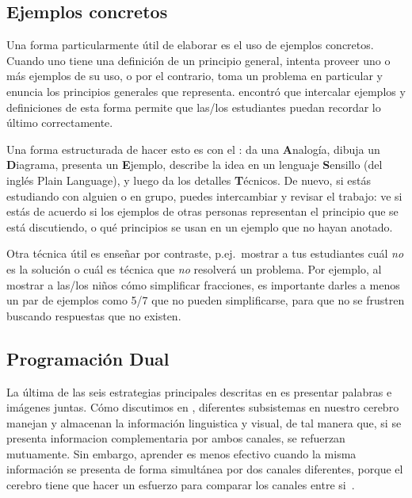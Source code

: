 \subsection*{Ejemplos concretos}

Una forma particularmente útil de elaborar es el uso de ejemplos concretos.
Cuando uno tiene una definición de un principio general,
intenta proveer uno o más ejemplos de su uso,
o por el contrario, toma un problema en particular y enuncia los principios generales que representa.
\cite{Raws2014} encontró que intercalar ejemplos y definiciones de esta forma
permite que las/los estudiantes puedan recordar lo último correctamente.

Una forma estructurada de hacer esto es con
el :
da una \textbf{A}nalogía,
dibuja un \textbf{D}iagrama,
presenta un \textbf{E}jemplo,
describe la idea en un lenguaje \textbf{S}ensillo (del inglés Plain Language),
y luego da los detalles \textbf{T}écnicos.
De nuevo,
si estás estudiando con alguien o en grupo,
puedes intercambiar y revisar el trabajo:
ve si estás de acuerdo si los ejemplos de otras personas representan el principio que se está discutiendo,
o qué principios se usan en un ejemplo que no hayan anotado.

Otra técnica útil es enseñar por contraste,
p.ej.\ mostrar a tus estudiantes cuál \emph{no} es la solución
o cuál es técnica que \emph{no} resolverá un problema.
Por ejemplo,
al mostrar a las/los niños cómo simplificar fracciones,
es importante darles a menos un par de ejemplos como 5/7 que no pueden simplificarse,
para que no se frustren buscando respuestas que no existen.

\subsection*{Programación Dual}

La última de las seis estrategias principales
descritas en 
es presentar palabras e imágenes juntas.
Cómo discutimos en ,
diferentes subsistemas en nuestro cerebro manejan y almacenan la información linguistica y visual,
de tal manera que, si se presenta informacion complementaria por ambos canales,
se refuerzan mutuamente.
Sin embargo,
aprender es menos efectivo cuando la misma información se presenta de forma simultánea por dos canales diferentes,
porque el cerebro tiene que hacer un esfuerzo para comparar los canales entre si~\cite{Maye2003}.

